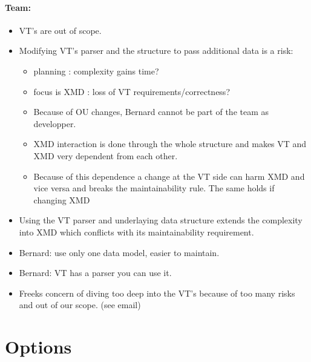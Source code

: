 \documentclass[a4paper,11pt,final]{article}
\begin{document}
\paragraph{Team:}
\begin{itemize}
\item VT’s are out of scope.
\item Modifying VT’s parser and the structure to pass additional data is a risk:
	\begin{itemize}
	\item planning : complexity gains time?
	\item focus is XMD : loss of VT requirements/correctness?
	\item Because of OU changes, Bernard cannot be part of the team as developper.
	\item XMD interaction is done through the whole structure and makes VT and XMD very dependent from each other.
	\item Because of this dependence a change at the VT side can harm XMD and vice versa and breaks the maintainability rule.
		The same holds if changing XMD 
	\end{itemize}
\item	Using the VT parser and underlaying data structure extends the complexity into XMD which conflicts with its maintainability requirement.
\item Bernard: use only one data model, easier to maintain.
\item Bernard: VT has a parser you can use it.
\item Freeks concern of diving too deep into the VT’s because of too many risks and out of our scope. (see email)
\end{itemize}

\section{Options}
\paragraph{}
\end{document}
